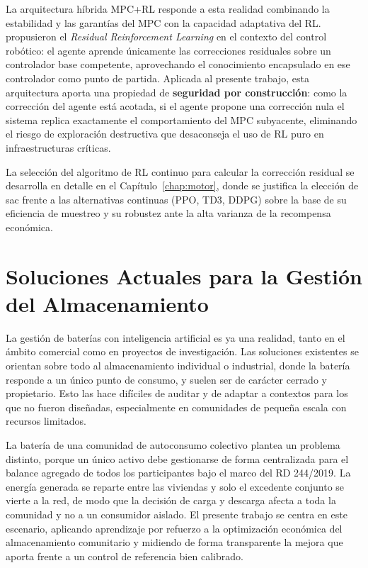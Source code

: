 \documentclass[12pt, a4paper, twoside]{report}
\begin{document}
La arquitectura híbrida MPC+RL responde a esta realidad combinando la
estabilidad y las garantías del MPC con la capacidad adaptativa del RL.
\citet{Johannink2019} propusieron el \textit{Residual Reinforcement Learning}
en el contexto del control robótico: el agente aprende únicamente las
correcciones residuales sobre un controlador base competente, aprovechando el
conocimiento encapsulado en ese controlador como punto de partida. Aplicada al
presente trabajo, esta arquitectura aporta una propiedad de \textbf{seguridad
por construcción}: como la corrección del agente está acotada, si el agente
propone una corrección nula el sistema replica exactamente el comportamiento
del MPC subyacente, eliminando el riesgo de exploración destructiva que
desaconseja el uso de RL puro en infraestructuras críticas.

La selección del algoritmo de RL continuo para calcular la corrección residual
se desarrolla en detalle en el Capítulo~\ref{chap:motor}, donde se justifica la
elección de \acrshort{sac} frente a las alternativas continuas (PPO, TD3, DDPG)
sobre la base de su eficiencia de muestreo y su robustez ante la alta varianza
de la recompensa económica.

\section{Soluciones Actuales para la Gestión del Almacenamiento}

La gestión de baterías con inteligencia artificial es ya una realidad, tanto en
el ámbito comercial como en proyectos de investigación. Las soluciones
existentes se orientan sobre todo al almacenamiento individual o industrial,
donde la batería responde a un único punto de consumo, y suelen ser de carácter
cerrado y propietario. Esto las hace difíciles de auditar y de adaptar a
contextos para los que no fueron diseñadas, especialmente en comunidades de
pequeña escala con recursos limitados.

La batería de una comunidad de autoconsumo colectivo plantea un problema
distinto, porque un único activo debe gestionarse de forma centralizada para el
balance agregado de todos los participantes bajo el marco del RD 244/2019. La
energía generada se reparte entre las viviendas y solo el excedente conjunto se
vierte a la red, de modo que la decisión de carga y descarga afecta a toda la
comunidad y no a un consumidor aislado. El presente trabajo se centra en este
escenario, aplicando aprendizaje por refuerzo a la optimización económica del
almacenamiento comunitario y midiendo de forma transparente la mejora que aporta
frente a un control de referencia bien calibrado.
\end{document}
